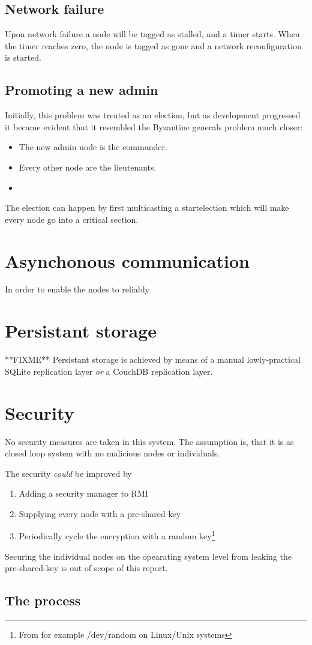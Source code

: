 \documentclass[10pt,a4paper]{article}
\begin{document}
\subsection{Network failure}

Upon network failure a node will be tagged as stalled, and a timer starts. When the timer reaches zero, the node is tagged as gone and a network reconfiguration is started.

\subsection{Promoting a new admin}
Initially, this problem was treated as an election, but as development progressed it became evident that it resembled the Byzantine generals problem much closer:
\begin{itemize}
\item The new admin node is the commander.
\item Every other node are the lieutenants.
\item 
\end{itemize}

The election can happen by first multicasting a startelection which will make every node go into a critical section.

\section{Asynchonous communication}
In order to enable the nodes to reliably 

\section{Persistant storage}
**FIXME** Persistant storage is achieved by means of a manual lowly-practical SQLite replication layer \emph{or} a CouchDB replication layer.

\section{Security}
No security measures are taken in this system. The assumption is, that it is as closed loop system with no malicious nodes or individuals.

The security \emph{could} be improved by 
\begin{enumerate}
\item Adding a security manager to RMI
\item Supplying every node with a pre-shared key
\item Periodically cycle the encryption with a random key\footnote{From for example /dev/random on Linux/Unix systems}
\end{enumerate}
Securing the individual nodes on the opearating system level from leaking the pre-shared-key is out of scope of this report.

\subsection{The process}
\end{document}
